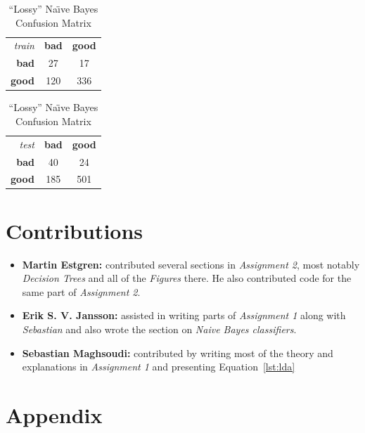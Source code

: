 \documentclass[a4paper, twocolumn]{article}
\begin{document}
        \begin{table}[h]
        \begin{center}
        \begin{tabular}{r|c|c|}
            \multicolumn{1}{r}{\emph{train}}
            &\multicolumn{1}{c}{\textbf{bad}}
            &\multicolumn{1}{c}{\textbf{good}} \\
            \cline{2-3}
            \textbf{bad} & 27 & 17 \\
            \cline{2-3}
            \textbf{good} & 120 & 336 \\
            \cline{2-3}
        \end{tabular}
        \begin{tabular}{r|c|c|}
            \multicolumn{1}{r}{\emph{test}}
            &\multicolumn{1}{c}{\textbf{bad}}
            &\multicolumn{1}{c}{\textbf{good}} \\
            \cline{2-3}
            \textbf{bad} & 40 & 24 \\
            \cline{2-3}
            \textbf{good} & 185 & 501 \\
            \cline{2-3}
        \end{tabular}
        \end{center}
        \caption{``Lossy'' Na{\"\i}ve Bayes Confusion Matrix}
        \label{table:bayes10}
        \end{table}

        \section*{Contributions}
            \begin{itemize}
                \item{\textbf{Martin Estgren:} contributed several sections in \emph{Assignment 2}, most notably \emph{Decision Trees} and all of the \emph{Figures} there. He also contributed code for the same part of \emph{Assignment 2}.}
                \item{\textbf{Erik S. V. Jansson:} assisted in writing parts of \emph{Assignment 1} along with \emph{Sebastian} and also wrote the section on \emph{Naive Bayes classifiers}.}
                \item{\textbf{Sebastian Maghsoudi:} contributed by writing most of the theory and explanations in \emph{Assignment 1} and presenting Equation~\ref{lst:lda}}
            \end{itemize}

    \nocite{*} %
    
    
    \onecolumn \appendix
    \section*{Appendix}

    
    
    
\end{document}
